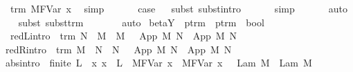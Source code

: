 \begin{isabellebody}
\ {}{\isacharcolon}\ {\isachardoublequoteopen}trm\ M{\isacharcircum}FVar\ x{\isachardoublequoteclose}\ \isamarkupfalse%
\ simp\isanewline
\ \ \isanewline
\ \ \isamarkupfalse%
\ {\isacharquery}case\isanewline
\ \ \isamarkupfalse%
{\isacharparenleft}subst\ subst{\isacharunderscore}intro{}{\isacharparenright}\isanewline
\ \ \isamarkupfalse%
\ {}\ \isamarkupfalse%
\ simp\isanewline
\ \ \isamarkupfalse%
\ {}\ \isamarkupfalse%
\ auto{\isacharbrackleft}{}{\isacharbrackright}\isanewline
\ \ \isamarkupfalse%
\ {\isacharparenleft}subst\ subst{\isacharunderscore}trm{\isacharparenright}\isanewline
\ \ \isamarkupfalse%
\ {}\ {}\ \isamarkupfalse%
\ auto\isanewline
{}\isamarkupfalse%
%
\endisatagproof
{\isafoldproof}%
%
\isadelimproof
%
\endisadelimproof
%
\isamarkuptrue%
\isamarkupfalse%
\ beta{\isacharunderscore}Y\ {\isacharcolon}{\isacharcolon}\ {\isachardoublequoteopen}ptrm\ {\isasymRightarrow}\ ptrm\ {\isasymRightarrow}\ bool{\isachardoublequoteclose}\ {\isacharparenleft}\ {\isachardoublequoteopen}{\isasymRightarrow}{\isachardoublequoteclose}\ {}{}{}{\isacharparenright}\isanewline
{}\isanewline
\ \ red{\isacharunderscore}L{\isacharbrackleft}intro{\isacharbrackright}{\isacharcolon}\ {\isachardoublequoteopen}{\isasymlbrakk}\ trm\ N\ {\isacharsemicolon}\ M\ {\isasymRightarrow}\ M{\isacharprime}\ {\isasymrbrakk}\ {\isasymLongrightarrow}\ App\ M\ N\ {\isasymRightarrow}\ App\ M{\isacharprime}\ N{\isachardoublequoteclose}\isanewline
{\isacharbar}\ red{\isacharunderscore}R{\isacharbrackleft}intro{\isacharbrackright}{\isacharcolon}\ {\isachardoublequoteopen}{\isasymlbrakk}\ trm\ M\ {\isacharsemicolon}\ N\ {\isasymRightarrow}\ N{\isacharprime}\ {\isasymrbrakk}\ {\isasymLongrightarrow}\ App\ M\ N\ {\isasymRightarrow}\ App\ M\ N{\isacharprime}{\isachardoublequoteclose}\isanewline
{\isacharbar}\ abs{\isacharbrackleft}intro{\isacharbrackright}{\isacharcolon}\ {\isachardoublequoteopen}{\isasymlbrakk}\ finite\ L\ {\isacharsemicolon}\ {\isacharparenleft}{\isasymAnd}x{\isachardot}\ x\ {\isasymnotin}\ L\ {\isasymLongrightarrow}\ M{\isacharcircum}{\isacharparenleft}FVar\ x{\isacharparenright}\ {\isasymRightarrow}\ M{\isacharprime}{\isacharcircum}{\isacharparenleft}FVar\ x{\isacharparenright}{\isacharparenright}\ {\isasymrbrakk}\ {\isasymLongrightarrow}\ Lam\ M\ {\isasymRightarrow}\ Lam\ M{\isacharprime}{\isachardoublequoteclose}\isanewline

\end{isabellebody}
